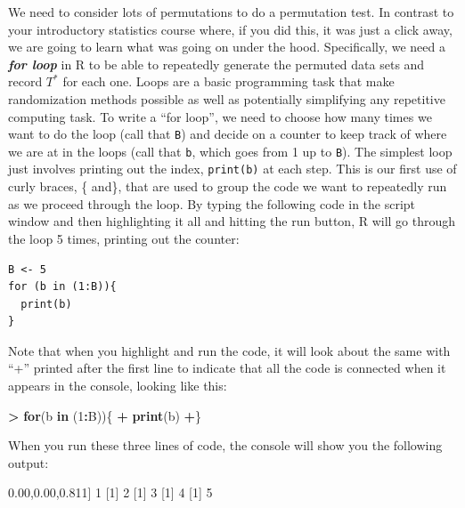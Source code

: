 \documentclass[]{book}
\newenvironment{Shaded}{\begin{snugshade}}{\end{snugshade}}
\newcommand{\KeywordTok}[1]{\textcolor[rgb]{0.13,0.29,0.53}{\textbf{#1}}}
\newcommand{\DecValTok}[1]{\textcolor[rgb]{0.00,0.00,0.81}{#1}}
\newcommand{\StringTok}[1]{\textcolor[rgb]{0.31,0.60,0.02}{#1}}
\newcommand{\ControlFlowTok}[1]{\textcolor[rgb]{0.13,0.29,0.53}{\textbf{#1}}}
\newcommand{\OperatorTok}[1]{\textcolor[rgb]{0.81,0.36,0.00}{\textbf{#1}}}
\newcommand{\NormalTok}[1]{#1}
\begin{document}
We need to consider lots of permutations to do a permutation test. In
contrast to your introductory statistics course where, if you did this,
it was just a click away, we are going to learn what was going on under
the hood. Specifically, we need a \textbf{\emph{for loop}} in R to be
able to repeatedly generate the permuted data sets and record \(T^*\)
for each one. Loops are a basic programming task that make randomization
methods possible as well as potentially simplifying any repetitive
computing task. To write a ``for loop'', we need to choose how many
times we want to do the loop (call that \texttt{B}) and decide on a
counter to keep track of where we are at in the loops (call that
\texttt{b}, which goes from 1 up to \texttt{B}). The simplest loop just
involves printing out the index, \texttt{print(b)} at each step. This is
our first use of curly braces, \{ and\}, that are used to group the code
we want to repeatedly run as we proceed through the loop. By typing the
following code in the script window and then highlighting it all and
hitting the run button, R will go through the loop 5 times, printing out
the counter:

\begin{verbatim}
B <- 5
for (b in (1:B)){
  print(b)
}
\end{verbatim}

Note that when you highlight and run the code, it will look about the
same with ``+'' printed after the first line to indicate that all the
code is connected when it appears in the console, looking like this:

\begin{Shaded}
\begin{Highlighting}[]
\OperatorTok{>}\StringTok{ }\ControlFlowTok{for}\NormalTok{(b }\ControlFlowTok{in}\NormalTok{ (}\DecValTok{1}\OperatorTok{:}\NormalTok{B))\{}
\OperatorTok{+}\StringTok{   }\KeywordTok{print}\NormalTok{(b)}
\OperatorTok{+}\NormalTok{\}}
\end{Highlighting}
\end{Shaded}

When you run these three lines of code, the console will show you the
following output:

\begin{Shaded}
\begin{Highlighting}[]
\NormalTok{[}\DecValTok{1}\NormalTok{] }\DecValTok{1}
\NormalTok{[}\DecValTok{1}\NormalTok{] }\DecValTok{2}
\NormalTok{[}\DecValTok{1}\NormalTok{] }\DecValTok{3}
\NormalTok{[}\DecValTok{1}\NormalTok{] }\DecValTok{4}
\NormalTok{[}\DecValTok{1}\NormalTok{] }\DecValTok{5}
\end{Highlighting}
\end{Shaded}
\end{document}
